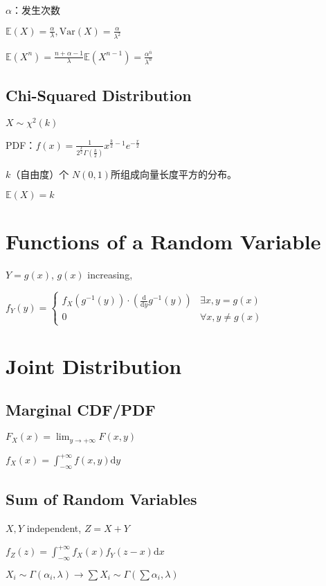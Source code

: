 \documentclass[9pt,landscape]{article}
\begin{document}
\begin{multicols}{3}
$\alpha$：发生次数

$\mathbb{E}(X)=\frac{\alpha}{\lambda}, \mathrm{Var}(X)=\frac{\alpha}{\lambda^2}$

$\mathbb{E}(X^n)=\frac{n+\alpha-1}{\lambda}\mathbb{E}(X^{n-1})=\frac{\alpha^{\overline{n}}}{\lambda^n}$

\subsection{Chi-Squared Distribution}

$X\sim \chi^2(k)$

PDF：$f(x)=\frac{1}{2^{\frac{k}{2}}\Gamma\left(\frac{k}{2}\right)}x^{\frac{k}{2}-1}e^{-\frac{x}{2}}$

$k$（自由度）个 $N(0, 1)$所组成向量长度平方的分布。

$\mathbb{E}(X)=k$

\section{Functions of a Random Variable}
$Y=g(x)$, $g(x)$ increasing,

$f_Y(y)=\begin{cases}
	f_X\left(g^{-1}(y)\right)\cdot\left(\frac{\mathrm{d}}{\mathrm{d}y}g^{-1}(y)\right) & \exists x, y=g(x)\\
	0 & \forall x, y\neq g(x)
\end{cases}$

\section{Joint Distribution}

\subsection{Marginal CDF/PDF}
$F_X(x)=\lim_{y\to +\infty}F(x, y)$

$f_X(x)=\int_{-\infty}^{+\infty}f(x, y)\mathrm{d}y$

\subsection{Sum of Random Variables}

$X, Y$ independent, $Z=X+Y$

$f_Z(z)=\int_{-\infty}^{+\infty}f_X(x)f_Y(z-x)\mathrm{d}x$

$X_i\sim \Gamma(\alpha_i, \lambda)\to \sum X_i\sim\Gamma(\sum\alpha_i, \lambda)$


\end{multicols}
\end{document}
